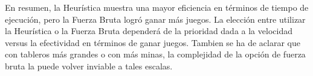 \documentclass{article}
\begin{document}
En resumen, la Heurística muestra una mayor eficiencia en términos de tiempo de ejecución, pero la Fuerza Bruta logró ganar más juegos. La elección entre utilizar la Heurística o la Fuerza Bruta dependerá de la prioridad dada a la velocidad versus la efectividad en términos de ganar juegos. Tambien se ha de aclarar que con tableros más grandes o con más minas, la complejidad de la opción de fuerza bruta la puede volver inviable a tales escalas.
\end{document}
